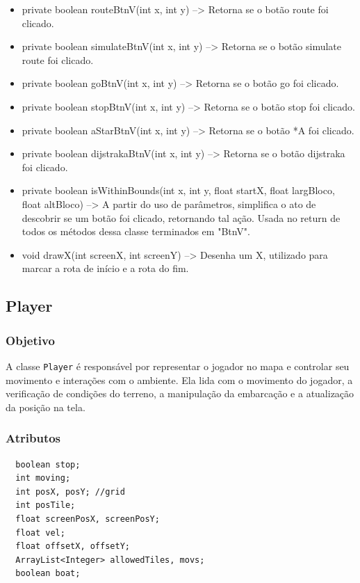 \documentclass[
	12pt,				%
	oneside,			%
	a4paper,			%
	english,			%
	brazil,				%
	]{abntex2}
\begin{document}
{\begin{itemize}
    \item private boolean routeBtnV(int x, int y) --> Retorna se o botão route foi clicado.
    \item private boolean simulateBtnV(int x, int y) --> Retorna se o botão simulate route foi clicado.
    \item private boolean goBtnV(int x, int y) --> Retorna se o botão go foi clicado.
    \item private boolean stopBtnV(int x, int y) --> Retorna se o botão stop foi clicado.
    \item private boolean aStarBtnV(int x, int y) --> Retorna se o botão *A foi clicado.
    \item private boolean dijstrakaBtnV(int x, int y) --> Retorna se o botão dijstraka foi clicado.
    \item private boolean isWithinBounds(int x, int y, float startX, float largBloco, float altBloco) --> A partir do uso de parâmetros, simplifica o ato de descobrir se um botão foi clicado, retornando tal ação. Usada no return de todos os métodos dessa classe terminados em "BtnV".
    \item void drawX(int screenX, int screenY) --> Desenha um X, utilizado para marcar a rota de início e a rota do fim.
\end{itemize}

\subsection{Player}

\subsubsection{Objetivo}
A classe \texttt{Player} é responsável por representar o jogador no mapa e controlar seu movimento e interações com o ambiente. Ela lida com o movimento do jogador, a verificação de condições do terreno, a manipulação da embarcação e a atualização da posição na tela.

\subsubsection{Atributos}

\begin{lstlisting}
  boolean stop;
  int moving;
  int posX, posY; //grid
  int posTile;
  float screenPosX, screenPosY;
  float vel;
  float offsetX, offsetY;
  ArrayList<Integer> allowedTiles, movs;
  boolean boat;
\end{lstlisting}

}
\end{document}
